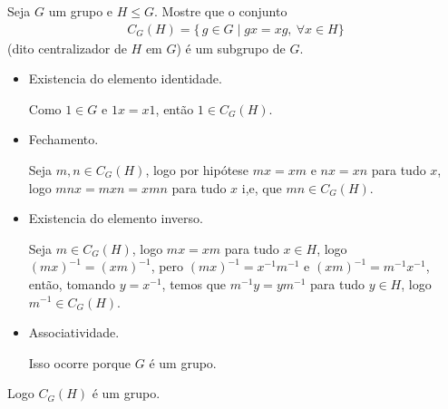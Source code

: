 \begin{homeworkProblem}
  Seja $G$ um grupo e $H \le G$. Mostre que o conjunto
  \begin{align*}
    C_G(H)=\{\, g \in G \mid gx = xg, \ \forall x \in H \}
  \end{align*}
  (dito centralizador de $H$ em $G$) é um subgrupo de $G$.
  \begin{solution}
    \begin{itemize}
      \item Existencia do elemento identidade.

        Como $1\in G$ e $1x=x1$, então $1\in C_G(H)$. 
      \item Fechamento.

        Seja $m,n\in C_G(H)$, logo por hipótese $mx=xm$ e $nx=xn$  para tudo $x$, logo $mnx=mxn=xmn$ para tudo $x$ i,e, que $mn\in C_G(H)$.
      \item Existencia do elemento inverso.

        Seja $m\in C_G(H)$, logo $mx=xm$ para tudo $x\in H$, logo $(mx)^{-1}=(xm)^{-1}$, pero $(mx)^{-1}=x^{-1}m^{-1}$ e $(xm)^{-1}=m^{-1}x^{-1}$, então, tomando $y = x^{-1}$, temos que $m^{-1}y=ym^{-1}$ para tudo $y\in H$, logo $m^{-1}\in C_G(H)$.
      \item Associatividade.

        Isso ocorre porque $G$ é um grupo. 
    \end{itemize}
    Logo $C_G(H)$ é um grupo. 
  \end{solution}
\end{homeworkProblem}
